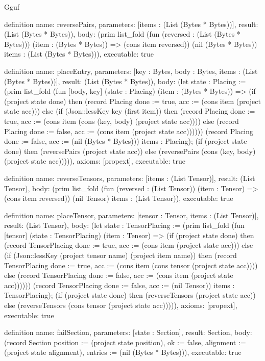 \begin{lexlean}{Gguf}
\begin{semanticmodule}
definition{
  name: reversePairs,
  parameters: [items : (List (Bytes * Bytes))],
  result: (List (Bytes * Bytes)),
  body: (prim list_fold (fun (reversed : (List (Bytes * Bytes))) (item : (Bytes * Bytes)) => (cons item reversed)) (nil (Bytes * Bytes)) items : (List (Bytes * Bytes))),
  executable: true
}

definition{
  name: placeEntry,
  parameters: [key : Bytes, body : Bytes, items : (List (Bytes * Bytes))],
  result: (List (Bytes * Bytes)),
  body: (let state : Placing := (prim list_fold (fun [body, key] (state : Placing) (item : (Bytes * Bytes)) => (if (project state done) then (record Placing {done := true, acc := (cons item (project state acc))}) else (if (Json::lessKey key (first item)) then (record Placing {done := true, acc := (cons item (cons (key, body) (project state acc)))}) else (record Placing {done := false, acc := (cons item (project state acc))})))) (record Placing {done := false, acc := (nil (Bytes * Bytes))}) items : Placing); (if (project state done) then (reversePairs (project state acc)) else (reversePairs (cons (key, body) (project state acc))))),
  axioms: [propext],
  executable: true
}

definition{
  name: reverseTensors,
  parameters: [items : (List Tensor)],
  result: (List Tensor),
  body: (prim list_fold (fun (reversed : (List Tensor)) (item : Tensor) => (cons item reversed)) (nil Tensor) items : (List Tensor)),
  executable: true
}

definition{
  name: placeTensor,
  parameters: [tensor : Tensor, items : (List Tensor)],
  result: (List Tensor),
  body: (let state : TensorPlacing := (prim list_fold (fun [tensor] (state : TensorPlacing) (item : Tensor) => (if (project state done) then (record TensorPlacing {done := true, acc := (cons item (project state acc))}) else (if (Json::lessKey (project tensor name) (project item name)) then (record TensorPlacing {done := true, acc := (cons item (cons tensor (project state acc)))}) else (record TensorPlacing {done := false, acc := (cons item (project state acc))})))) (record TensorPlacing {done := false, acc := (nil Tensor)}) items : TensorPlacing); (if (project state done) then (reverseTensors (project state acc)) else (reverseTensors (cons tensor (project state acc))))),
  axioms: [propext],
  executable: true
}

definition{
  name: failSection,
  parameters: [state : Section],
  result: Section,
  body: (record Section {position := (project state position), ok := false, alignment := (project state alignment), entries := (nil (Bytes * Bytes))}),
  executable: true
}


\end{semanticmodule}
\end{lexlean}
